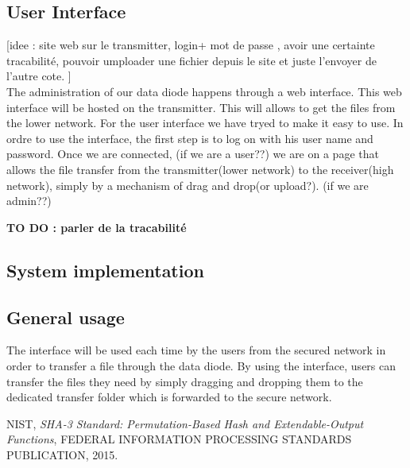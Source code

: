 \documentclass[a4paper,10pt]{article}
\begin{document}
\subsection{User Interface}\label{UI}


[idee : site web sur le transmitter, login+ mot de passe , avoir une certainte tracabilité, pouvoir umploader une fichier depuis le site et juste l'envoyer de l'autre cote. ]\\


The administration of our data diode happens through a web interface.
This web interface will be hosted on the transmitter. This will allows to get the
files from the lower network. For the user interface we have tryed to make it
easy to use. In ordre to use the interface, the first step is to log on with his
user name and password.  Once we are connected, (if we are a user??)
we are on a page that allows the file transfer from the transmitter(lower network)
to the receiver(high network), simply by a mechanism of drag and drop(or upload?).
(if we are admin??)

\textbf{TO DO : parler de la tracabilité}


\subsection{System implementation}
\subsection{General usage}
The interface will be used each time by the users from the secured network
in order to transfer a file through the data diode. By using the interface,
users can transfer the files they need by simply dragging and dropping them to
the dedicated transfer folder which is forwarded to the secure network.


\begin{thebibliography}{9}

NIST,
\textit{SHA-3 Standard: Permutation-Based Hash and Extendable-Output Functions},
FEDERAL INFORMATION PROCESSING STANDARDS PUBLICATION,
2015.

\end{thebibliography}
\end{document}
